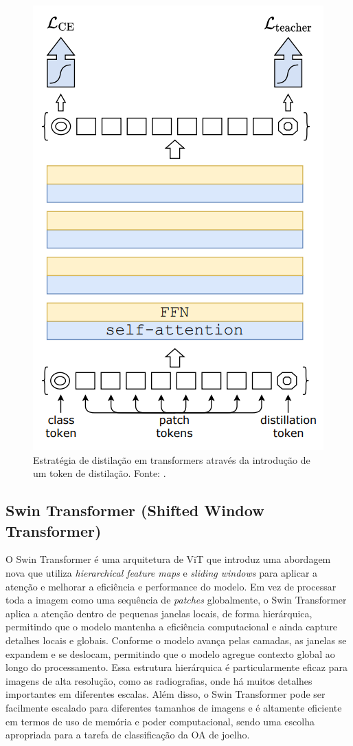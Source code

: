 \begin{figure}
    \centering
    \includegraphics[width=0.5\linewidth]{figs/distillation-procedure-deit.png}
    \caption{Estratégia de distilação em transformers através da introdução de um token de distilação. Fonte: \cite{Touvron2021}.}
    \label{fig:distillation-procedure}
\end{figure}

\subsection{Swin Transformer (Shifted Window Transformer)}

O Swin Transformer \cite{Liu2021} é uma arquitetura de ViT que introduz uma abordagem nova que utiliza \textit{hierarchical feature maps} e \textit{sliding windows} para aplicar a atenção e melhorar a eficiência e performance do modelo. Em vez de processar toda a imagem como uma sequência de \textit{patches} globalmente, o Swin Transformer aplica a atenção dentro de pequenas janelas locais, de forma hierárquica, permitindo que o modelo mantenha a eficiência computacional e ainda capture detalhes locais e globais. Conforme o modelo avança pelas camadas, as janelas se expandem e se deslocam, permitindo que o modelo agregue contexto global ao longo do processamento. Essa estrutura hierárquica é particularmente eficaz para imagens de alta resolução, como as radiografias, onde há muitos detalhes importantes em diferentes escalas. Além disso, o Swin Transformer pode ser facilmente escalado para diferentes tamanhos de imagens e é altamente eficiente em termos de uso de memória e poder computacional, sendo uma escolha apropriada para a tarefa de classificação da OA de joelho.

